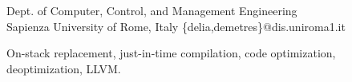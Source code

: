 \documentclass[10pt]{sigplanconf}
\begin{document}
\setlength{\pdfpageheight}{\paperheight}
\setlength{\pdfpagewidth}{\paperwidth}

\toappear{}






\newcommand{\anon}{$\bullet\bullet\bullet\bullet\bullet$}

\title{}

           {{\small Dept. of Computer, Control, and Management Engineering\\Sapienza University of Rome, Italy}} %
           {\{delia,demetres\}@dis.uniroma1.it} %

\maketitle

\begin{abstract}

\end{abstract}



\keywords
On-stack replacement, just-in-time compilation, code optimization, deoptimization, LLVM.









\balance %

\end{document}
